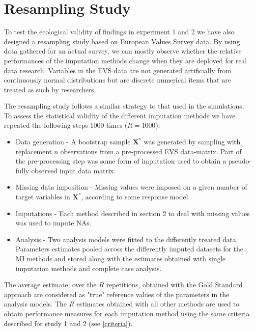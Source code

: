 \maketitle
\section{Resampling Study}

To test the ecological validity of findings in experiment 1 and 2 we have also designed a
resampling study based on European Values Survey data.
By using data gathered for an actual survey, we can mostly observe whether the relative 
performances of the imputation methods change when they are deployed for real data research.
Variables in the EVS data are not generated artificially from continuously normal distributions 
but are discrete numerical items that are treated as such by researchers.

The resampling study follows a similar strategy to that used in the simulations. 
To assess the statistical validity of the different imputation methods we have repeated the 
following steps 1000 times ($R = 1000$):

\begin{itemize}
	\item Data generation - A bootstrap sample $\bm{X}^{*}$ was generated by sampling with replacement $n$ 
		observations from a pre-processed EVS data-matrix. 
		Part of the pre-processing step was some form of imputation used to obtain a pseudo-fully observed 
		input data matrix.
	\item Missing data imposition - Missing values were imposed on a given number of target variables
		in $\bm{X}^{*}$, according to some response model.
	\item Imputations - Each method described in section 2 to deal with missing values was used to impute
		NAs.
	\item Analysis - Two analysis models were fitted to the differently treated data.
		Parameters estimates pooled across the differently imputed datasets for the MI methods and
		stored along with the estimates obtained with single imputation methods and complete case 
		analysis.
\end{itemize}

	The average estimate, over the $R$ repetitions, obtained with the Gold Standard approach are considered 
	as "true" reference values of the parameters in the analysis models.
	The $R$ estimates obtained with all other methods are used to obtain performance measures for each imputation 
	method using the same criteria described for study 1 and 2 (see \ref{criteria}).

